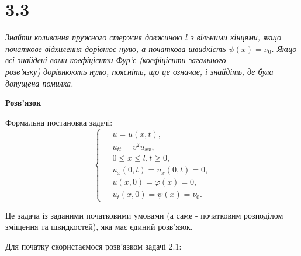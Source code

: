 

%



\section[Задача №3.3]{3.3}

\textit{Знайти коливання пружного стержня довжиною $l$ з вільними кінцями, якщо початкове відхилення дорівнює нулю, а початкова швидкість $\psi(x) = \nu_0$. Якщо всі знайдені вами коефіцієнти Фур'є (коефіцієнти загального\\ розв’язку) дорівнюють нулю, поясніть, що це означає, і знайдіть, де була допущена помилка.}

\begin{center}
    \textbf{Розв'язок}
\end{center}
Формальна постановка задачі:
\begin{equation} \label{probcond5}
    \left\{ \begin{aligned} %
        &\;u = u(x,t), \\
        &\;u_{tt} = v^2 u_{xx}, \\
        &\;0 \leq x \leq l, t \geq 0, \\
        &\;u_x(0,t) = u_x(0,t) = 0,\\
        &\;u(x,0) = \varphi(x) = 0, \\ 
        &\;u_t(x,0) = \psi(x) = \nu_0.
    \end{aligned} \right.
\end{equation}

Це задача із заданими початковими умовами (а саме - початковим розподілом зміщення та швидкостей), яка має єдиний розв'язок.

Для початку скористаємося розв'язком задачі 2.1:

